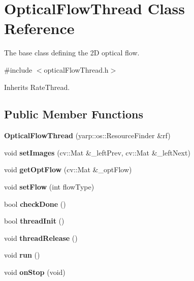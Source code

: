 \section{Optical\+Flow\+Thread Class Reference}
\label{classOpticalFlowThread}


The base class defining the 2\+D optical flow.  




{\ttfamily \#include $<$optical\+Flow\+Thread.\+h$>$}



Inherits Rate\+Thread.

\subsection*{Public Member Functions}
\begin{DoxyCompactItemize}
\item 
{\bfseries Optical\+Flow\+Thread} (yarp\+::os\+::\+Resource\+Finder \&rf)\label{classOpticalFlowThread_a2d90f6c196cc33c7d81ec35468896c8c}

\item 
void {\bfseries set\+Images} (cv\+::\+Mat \&\+\_\+left\+Prev, cv\+::\+Mat \&\+\_\+left\+Next)\label{classOpticalFlowThread_a6c04e7a9e28e792ff5d81f65ae11d67a}

\item 
void {\bfseries get\+Opt\+Flow} (cv\+::\+Mat \&\+\_\+opt\+Flow)\label{classOpticalFlowThread_ab052e551a0ad2f625b72661d9e8a2289}

\item 
void {\bfseries set\+Flow} (int flow\+Type)\label{classOpticalFlowThread_a2819e22da7950422f51f6331485468cf}

\item 
bool {\bfseries check\+Done} ()\label{classOpticalFlowThread_a8b201fe043a596728a9925bce91b2846}

\item 
bool {\bfseries thread\+Init} ()\label{classOpticalFlowThread_aecc4312f7a794c9668dd2e8bb6099939}

\item 
void {\bfseries thread\+Release} ()\label{classOpticalFlowThread_a90234a9a3f4aa898413cfb36aac4a979}

\item 
void {\bfseries run} ()\label{classOpticalFlowThread_a0329bf989f05e6715bbaccde904fe88f}

\item 
void {\bfseries on\+Stop} (void)\label{classOpticalFlowThread_ac30f26065348c602f160421aa69a7ed3}

\end{DoxyCompactItemize}



